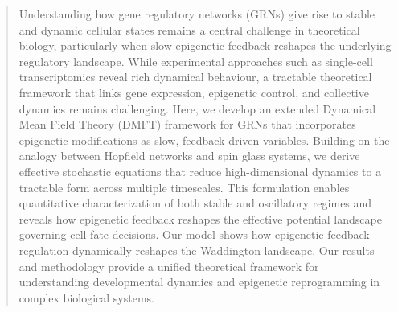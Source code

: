 \documentclass[reprint,amsmath,amssymb,aps]{revtex4-2}
\begin{document}
\begin{abstract}
Understanding how gene regulatory networks (GRNs) give rise to stable and dynamic cellular states remains a central challenge in theoretical biology, particularly when slow epigenetic feedback reshapes the underlying regulatory landscape. While experimental approaches such as single-cell transcriptomics reveal rich dynamical behaviour, a tractable theoretical framework that links gene expression, epigenetic control, and collective dynamics remains challenging. Here, we develop an extended Dynamical Mean Field Theory (DMFT) framework for GRNs that incorporates epigenetic modifications as slow, feedback-driven variables. Building on the analogy between Hopfield networks and spin glass systems, we derive effective stochastic equations that reduce high-dimensional dynamics to a tractable form across multiple timescales. This formulation enables quantitative characterization of both stable and oscillatory regimes and reveals how epigenetic feedback reshapes the effective potential landscape governing cell fate decisions. Our model shows how epigenetic feedback regulation dynamically reshapes the Waddington landscape. Our results and methodology provide a unified theoretical framework for understanding developmental dynamics and epigenetic reprogramming in complex biological systems.
\end{abstract}

\maketitle
\end{document}
